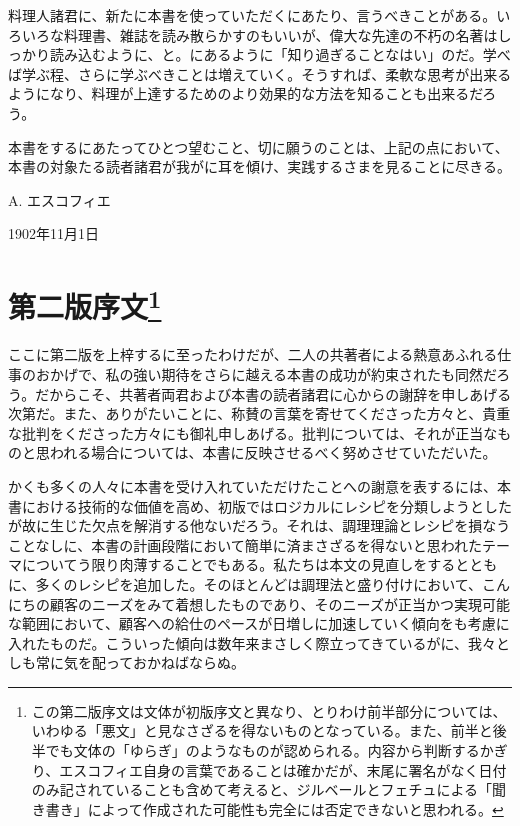 料理人諸君に、新たに本書を使っていただくにあたり、言うべきことがある。いろいろな料理書、雑誌を読み散らかすのもいいが、偉大な先達の不朽の名著はしっかり読み込むように、と。にあるように「知り過ぎることなはい」のだ。学べば学ぶ程、さらに学ぶべきことは増えていく。そうすれば、柔軟な思考が出来るようになり、料理が上達するためのより効果的な方法を知ることも出来るだろう。

本書をするにあたってひとつ望むこと、切に願うのことは、上記の点において、本書の対象たる読者諸君が我がに耳を傾け、実践するさまを見ることに尽きる。\nopagebreak

\begin{flushright}
A. エスコフィエ \nopagebreak
\end{flushright}

1902年11月1日

\newpage

\hypertarget{introduction-deuxieme-edition}{%
\section[第二版序文]{\texorpdfstring{第二版序文\footnote{この第二版序文は文体が初版序文と異なり、とりわけ前半部分については、いわゆる「悪文」と見なさざるを得ないものとなっている。また、前半と後半でも文体の「ゆらぎ」のようなものが認められる。内容から判断するかぎり、エスコフィエ自身の言葉であることは確かだが、末尾に署名がなく日付のみ記されていることも含めて考えると、ジルベールとフェチュによる「聞き書き」によって作成された可能性も完全には否定できないと思われる。}}{第二版序文}}\label{introduction-deuxieme-edition}}

\normalsize
{}
\vspace*{1\zw}

ここに第二版を上梓するに至ったわけだが、二人の共著者による熱意あふれる仕事のおかげで、私の強い期待をさらに越える本書の成功が約束されたも同然だろう。だからこそ、共著者両君および本書の読者諸君に心からの謝辞を申しあげる次第だ。また、ありがたいことに、称賛の言葉を寄せてくださった方々と、貴重な批判をくださった方々にも御礼申しあげる。批判については、それが正当なものと思われる場合については、本書に反映させるべく努めさせていただいた。

かくも多くの人々に本書を受け入れていただけたことへの謝意を表するには、本書における技術的な価値を高め、初版ではロジカルにレシピを分類しようとしたが故に生じた欠点を解消する他ないだろう。それは、調理理論とレシピを損なうことなしに、本書の計画段階において簡単に済まさざるを得ないと思われたテーマについてう限り肉薄することでもある。私たちは本文の見直しをするとともに、多くのレシピを追加した。そのほとんどは調理法と盛り付けにおいて、こんにちの顧客のニーズをみて着想したものであり、そのニーズが正当かつ実現可能な範囲において、顧客への給仕のペースが日増しに加速していく傾向をも考慮に入れたものだ。こういった傾向は数年来まさしく際立ってきているがに、我々としも常に気を配っておかねばならぬ。

